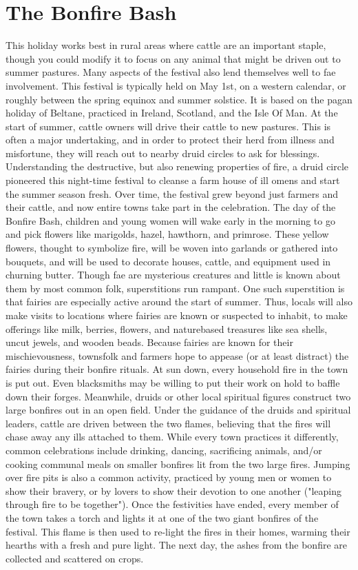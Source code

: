 \documentclass[10pt,a4paper,twoside,twocolumn,openany,bg=print,nodeprecatedcode]{dndbook}
\begin{document}
\section{The Bonfire Bash}
This holiday works best in rural areas where cattle are an important staple, though you could modify it to focus on any animal that might be driven out to summer pastures. Many aspects of the festival also lend themselves well to fae involvement. This festival is typically held on May 1st, on a western calendar, or roughly between the spring equinox and summer solstice. It is based on the pagan holiday of Beltane, practiced in Ireland, Scotland, and the Isle Of Man.
At the start of summer, cattle owners will drive their cattle to new pastures. This is often a major undertaking, and in order to protect their herd from illness and misfortune, they will reach out to nearby druid circles to ask for blessings. Understanding the destructive, but also renewing properties of fire, a druid circle pioneered this night-time festival to cleanse a farm house of ill omens and start the summer season fresh. Over time, the festival grew beyond just farmers and their cattle, and now entire towns take part in the celebration.
The day of the Bonfire Bash, children and young women will wake early in the morning to go and pick flowers like marigolds, hazel, hawthorn, and primrose. These yellow flowers, thought to symbolize fire, will be woven into garlands or gathered into bouquets, and will be used to decorate houses, cattle, and equipment used in churning butter.
Though fae are mysterious creatures and little is known about them by most common folk, superstitions run rampant. One such superstition is that fairies are especially active around the start of summer. Thus, locals will also make visits to locations where fairies are known or suspected to inhabit, to make offerings like milk, berries, flowers, and naturebased treasures like sea shells, uncut jewels, and wooden beads. Because fairies are known for their mischievousness, townsfolk and farmers hope to appease (or at least distract) the fairies during their bonfire rituals.
At sun down, every household fire in the town is put out. Even blacksmiths may be willing to put their work on hold to baffle down their forges. Meanwhile, druids or other local spiritual figures construct two large bonfires out in an open field. Under the guidance of the druids and spiritual leaders, cattle are driven between the two flames, believing that the fires will chase away any ills attached to them.
While every town practices it differently, common celebrations include drinking, dancing, sacrificing animals, and/or cooking communal meals on smaller bonfires lit from the two large fires. Jumping over fire pits is also a common activity, practiced by young men or women to show their bravery, or by lovers to show their devotion to one another ("leaping through fire to be together"). Once the festivities have ended, every member of the town takes a torch and lights it at one of the two giant bonfires of the festival. This flame is then used to re-light the fires in their homes, warming their hearths with a fresh and pure light. The next day, the ashes from the bonfire are collected and scattered on crops.
\end{document}
